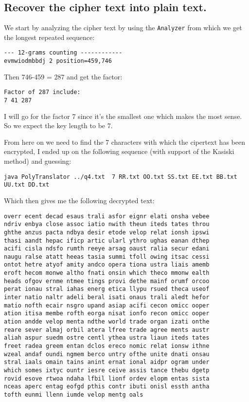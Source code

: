 \documentclass{article}
\begin{document}
\subsection{Recover the cipher text into plain text.}
We start by analyzing the cipher text by using the \texttt{Analyzer} from which we get the longest repeated sequence:

\begin{verbatim}
--- 12-grams counting ------------
evmwiodmbbdj 2 position=459,746
\end{verbatim}

Then 746-459 = 287 and get the factor:

\begin{verbatim}
Factor of 287 include:
7 41 287 
\end{verbatim}

I will go for the factor 7 since it's the smallest one which makes the most sense.
So we expect the key length to be 7.


From here on we need to find the 7 characters with which the cipertext has been encrypted, I ended up on the following sequence (with support of the Kasiski method) and guessing:

\begin{verbatim}
java PolyTranslator ../q4.txt  7 RR.txt OO.txt SS.txt EE.txt BB.txt UU.txt DD.txt
\end{verbatim}

Which then gives me the following decrypted text:
\begin{verbatim}
overr ecent decad esaus trali asfor eignr elati onsha vebee
ndriv enbya close assoc iatio nwith theun iteds tates throu
ghthe anzus pacta ndbya desir etode velop relat ionsh ipswi
thasi aandt hepac ificp artic ularl ythro ughas eanan dthep
acifi cisla ndsfo rumth reeye arsag oaust ralia secur edani
naugu ralse atatt heeas tasia summi tfoll owing itsac cessi
ontot hetre atyof amity andco opera tiona ustra liais amemb
eroft hecom monwe altho fnati onsin which theco mmonw ealth
heads ofgov ernme ntmee tings provi dethe mainf orumf orcoo
perat ionau stral iahas energ etica llypu rsued theca useof
inter natio naltr adeli beral isati onaus trali aledt hefor
matio nofth ecair nsgro upand asiap acifi cecon omicc ooper
ation itisa membe rofth eorga nisat ionfo recon omicc ooper
ation andde velop menta ndthe world trade organ izati onthe
reare sever almaj orbil atera lfree trade agree ments austr
aliah aspur suedm ostre centl ythea ustra liaun iteds tates
freet radea greem entan dclos ereco nomic relat ionsw ithne
wzeal andaf oundi ngmem berco untry ofthe unite dnati onsau
stral iaals omain tains anint ernat ional aidpr ogram under
which somes ixtyc ountr iesre ceive assis tance thebu dgetp
rovid esove rtwoa ndaha lfbil lionf ordev elopm entas sista
nceas aperc entag eofgd pthis contr ibuti onisl essth antha
tofth eunmi llenn iumde velop mentg oals
\end{verbatim}
\end{document}
